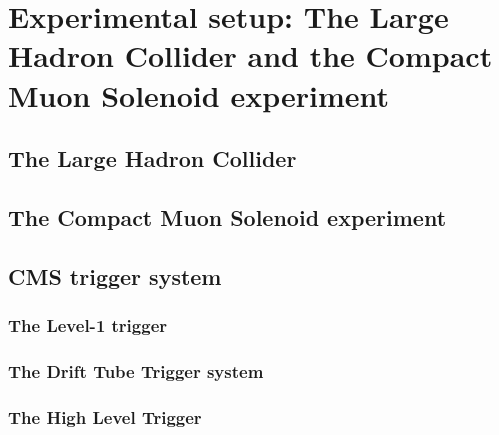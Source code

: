 \documentclass[../main.tex]{subfiles}
\begin{document}
\chapter{Experimental setup: The Large Hadron Collider and the Compact Muon Solenoid experiment}

\section{The Large Hadron Collider}

\section{The Compact Muon Solenoid experiment}

\section{CMS trigger system}

\subsection{The Level-1 trigger}

\subsection{The Drift Tube Trigger system}

\subsection{The High Level Trigger}
\end{document}
